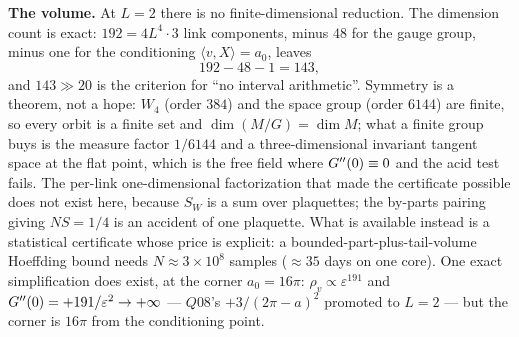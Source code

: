 \textbf{The volume.} At $L=2$ there is no finite-dimensional reduction. The dimension count is exact:
$192=4L^{4}\cdot3$ link components, minus $48$ for the gauge group, minus one for the conditioning
$\langle v,X\rangle=a_{0}$, leaves
\begin{equation}
192-48-1=143 ,
\label{eq:143}
\end{equation}
and $143\gg20$ is the criterion for ``no interval arithmetic''. Symmetry is a theorem, not a hope:
$W_{4}$ (order $384$) and the space group (order $6144$) are finite, so every orbit is a finite set and
$\dim(M/G)=\dim M$; what a finite group buys is the measure factor $1/6144$ and a three-dimensional
invariant tangent space at the flat point, which is the free field where $G''(0)\equiv0$ and the acid test
fails. The per-link one-dimensional factorization that made the certificate possible does not exist
here, because $S_{W}$ is a sum over plaquettes; the by-parts pairing giving $NS=1/4$ is an accident of
one plaquette. What is available instead is a statistical certificate whose price is explicit: a
bounded-part-plus-tail-volume Hoeffding bound needs $N\approx3\times10^{8}$ samples ($\approx35$ days
on one core). One exact simplification does exist, at the corner $a_{0}=16\pi$:
$\rho_{v}\propto\varepsilon^{191}$ and $G''(0)=+191/\varepsilon^{2}\to+\infty$ --- $Q08$'s
$+3/(2\pi-a)^{2}$ promoted to $L=2$ --- but the corner is $16\pi$ from the conditioning point. \LN
{}

